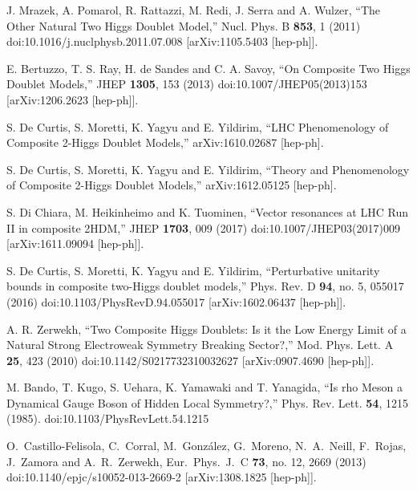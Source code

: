 J. Mrazek, A. Pomarol, R. Rattazzi, M. Redi,
J. Serra and A. Wulzer, ``The Other Natural Two Higgs Doublet Model,''
Nucl. Phys. B \textbf{853}, 1 (2011) doi:10.1016/j.nuclphysb.2011.07.008
{[}arXiv:1105.5403 {[}hep-ph{]}{]}. 

E. Bertuzzo, T. S. Ray, H. de Sandes and
C. A. Savoy, ``On Composite Two Higgs Doublet Models,'' JHEP \textbf{1305},
153 (2013) doi:10.1007/JHEP05(2013)153 {[}arXiv:1206.2623 {[}hep-ph{]}{]}.

S. De Curtis, S. Moretti, K. Yagyu and
E. Yildirim, ``LHC Phenomenology of Composite 2-Higgs Doublet Models,''
arXiv:1610.02687 {[}hep-ph{]}.

S. De Curtis, S. Moretti, K. Yagyu and
E. Yildirim, ``Theory and Phenomenology of Composite 2-Higgs Doublet
Models,'' arXiv:1612.05125 {[}hep-ph{]}.

S. Di Chiara, M. Heikinheimo and K. Tuominen,
``Vector resonances at LHC Run II in composite 2HDM,'' JHEP \textbf{1703},
009 (2017) doi:10.1007/JHEP03(2017)009 {[}arXiv:1611.09094 {[}hep-ph{]}{]}.

S. De Curtis, S. Moretti, K. Yagyu and
E. Yildirim, ``Perturbative unitarity bounds in composite two-Higgs
doublet models,'' Phys. Rev. D \textbf{94}, no. 5, 055017 (2016) doi:10.1103/PhysRevD.94.055017
{[}arXiv:1602.06437 {[}hep-ph{]}{]}.

A. R. Zerwekh, ``Two Composite Higgs Doublets:
Is it the Low Energy Limit of a Natural Strong Electroweak Symmetry
Breaking Sector?,'' Mod. Phys. Lett. A \textbf{25}, 423 (2010) doi:10.1142/S0217732310032627
{[}arXiv:0907.4690 {[}hep-ph{]}{]}.

M. Bando, T. Kugo, S. Uehara, K. Yamawaki and
T. Yanagida, ``Is rho Meson a Dynamical Gauge Boson of Hidden Local
Symmetry?,'' Phys. Rev. Lett. \textbf{54}, 1215 (1985). doi:10.1103/PhysRevLett.54.1215


O.~Castillo-Felisola, C.~Corral, M.~Gonz\'alez, G.~Moreno, N.~A.~Neill, F.~Rojas, J.~Zamora and A.~R.~Zerwekh,
Eur.\ Phys.\ J.\ C {\bf 73}, no. 12, 2669 (2013)
doi:10.1140/epjc/s10052-013-2669-2
[arXiv:1308.1825 [hep-ph]].


